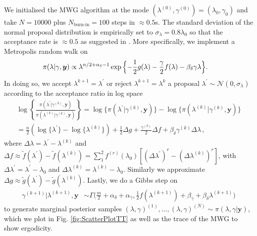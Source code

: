 We initialised the MWG algorithm at the mode $(\lambda^{(0)} , \gamma^{(0)}  ) = ( \lambda_{0} , \gamma_{0}  )$ and take $N = 10000$ plus $N_{\text{burn-in}} = 100$ steps in $\approx 0.5$s.
The standard deviation of the normal proposal distribution is empirically set to $\sigma_{\lambda} = 0.8 \lambda_0$ so that the acceptance rate is $\approx 0.5$ as suggested in \cite{robertsLecNot}.
More specifically, we implement a Metropolis random walk on
\begin{align}
	\label{eq:margApplCondGam}
	\pi(\lambda | \gamma, \bm{y}) &\propto \lambda^{n/2 +\alpha_{\delta}-1} \exp{\Bigl\{ - \frac{1}{2} g ( \lambda) - \frac{\gamma}{2} f ( \lambda) - \beta_\delta \gamma \lambda \Bigr\}}.
\end{align} 
In doing so, we accept $\lambda^{k+1} = \lambda^{\prime} $ or reject $\lambda^{k+1} = \lambda^{k} $  a proposal $\lambda^{\prime} \sim \mathcal{N}(0, \sigma_{\lambda})$ according to the acceptance ratio in log space
\begin{align} 
	\log \left\{ \frac{\pi(\lambda^{\prime} | \gamma^{(k)}, \bm{y})  }{\pi(\lambda^{(k)}| \gamma^{(k)}, \bm{y})}  \right\} 
	= \log  \{\pi(\lambda^{\prime} | \gamma^{(k)}, \bm{y} ) \}  -\log  \{ \pi(\lambda^{(k)}| \gamma^{(k)}, \bm{y}) \} \\
	= \frac{n}{2} (\log\{\lambda^{\prime}\} - \log\{\lambda^{(k)}\} ) + \frac{1}{2} \Delta g + \frac{\gamma^{(k)}}{2} \Delta f  + \beta_\delta \gamma^{(k)} \Delta \lambda  \, ,
\end{align}
where $\Delta \lambda = \lambda^{\prime} - \lambda^{(k)} $ and  $\Delta f \approx \tilde{f}(\lambda^\prime) - \tilde{f}(\lambda^{(k)}) =  \sum^2_1 f^{(r)} (\lambda_0) [(\Delta \lambda^\prime)^r - (\Delta \lambda^{(k)})^r] $, with  $\Delta \lambda^{\prime} = \lambda^\prime - \lambda_0 $ and $\Delta \lambda^{(k)} =  \lambda^{(k)} - \lambda_0$.
Similarly we approximate $\Delta g \approx \tilde{g}(\lambda^{\prime}) -\tilde{g}(\lambda^{(k)})$.
Lastly, we do a Gibbs step on
\begin{align}
	\gamma^{(k+1)} |  \lambda^{(k+1)}, \bm{y} &\sim \Gamma \bigg( \frac{m}{2} + \alpha_\delta + \alpha_\gamma, \frac{1}{2} f (\lambda^{(k+1)}) + \beta_\gamma + \beta_\delta \lambda^{(k+1)} \bigg)\label{eq:GibbsStep}
\end{align} 
to generate marginal posterior samples $(\lambda, \gamma)^{(1)}, \dots, (\lambda, \gamma)^{(N)} \sim  \pi(\lambda, \gamma| \bm{y})$, which we plot in Fig. \ref{fig:ScatterPlotTT} as well as the trace of the MWG to show ergodicity.
%
